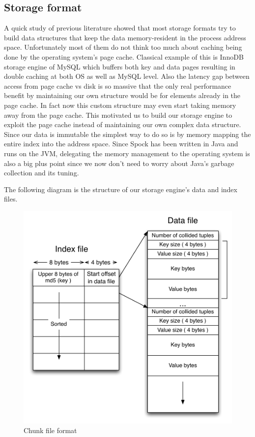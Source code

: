 \documentclass[twocolumn]{article}
\newcommand{\projectname}{Spock}
\begin{document}

\subsection{Storage format}
\label{sec:read_only:storage_format}

A quick study of previous literature showed that most storage formats try to build data structures that keep the data memory-resident in the process address space. Unfortunately most of them do not think too much about caching being done by the operating system's page cache. Classical example of this is InnoDB storage engine of MySQL which buffers both key and data pages resulting in double caching 
at both OS as well as MySQL level. Also the latency gap between access from page cache vs disk is so massive that the only real performance benefit by maintaining our own structure would be for elements already in the page cache. In fact now this custom structure may even start taking memory away from the page cache. This motivated us to build our storage engine to exploit the page cache instead of maintaining our own complex data structure. Since our data is immutable the simplest way to do so is by memory mapping the entire index into the address space. Since \projectname{} has been written in Java and runs on the JVM, delegating the memory management to the operating system is also a big plus point since we now don't need to worry about Java's garbage collection and its tuning.

The following diagram is the structure of our storage engine's data and index files. 

\begin{figure}
  \centering
    \includegraphics[scale=0.45]{images/storage_format.pdf}
  \caption{Chunk file format}
  \label{storage_format}
\end{figure}
\end{document}
